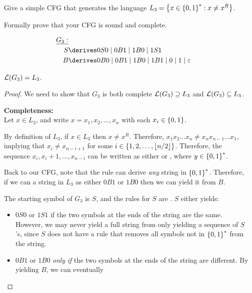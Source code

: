 \begin{problem}
  Give a simple CFG that generates the language
  $L_3 = \left\{x \in \left\{0, 1\right\}^* : x \ne x^R\right\}$.

  \step
  Formally prove that your CFG is sound and complete.
\end{problem}
\begin{Answer}
  \begin{align*}
    \underline{G_3:} \\
    S &\derives 0S0 \mid 0B1 \mid 1B0 \mid 1S1 \\
    B &\derives 0B0 \mid 0B1 \mid 1B0 \mid 1B1 \mid 0 \mid 1 \mid \eps
  \end{align*}

  \step
  \begin{claim}
    $\mathcal{L}(G_3) = L_3$.

    \begin{proof}
      We need to show that $G_3$ is both complete $\mathcal{L}(G_3) \supseteq L_3$
      and $\mathcal{L}(G_3) \subseteq L_3$.

      \step
      \textbf{Completeness:} \\
      Let $x \in L_3$, and write $x = x_1, x_2, \ldots, x_n$
      with each $x_i \in \left\{0, 1\right\}$.
      
      \step
      By definition of $L_3$, if $x \in L_3$ then $x \ne x^R$.
      Therefore, $x_1x_2 \ldots x_n \ne x_nx_{n-1} \ldots x_1$,
      implying that $x_i \ne x_{n-i+1}$ for some $i \in \left\{1, 2, \ldots, \lfloor{} n/2 \rfloor\right\}$.
      Therefore, the sequence $x_i, x_i+1, \ldots, x_{n-i}$
      can be written as either  or , where $y \in \left\{0, 1\right\}^*$.

      \step
      Back to our CFG, note that the rule
        can derive \emph{any} string in $\left\{0, 1\right\}^*$.
        Therefore, if we can a string in $L_3$ as either $0B1$ or $1B0$
        then we can yield it from $B$.

      \step
      The starting symbol of $G_3$ is $S$,
      and the rules for $S$ are .
      $S$ either yields:
      \begin{itemize}
        \item $0S0$ or $1S1$ if the two symbols at the ends of the string are the same.
          However, we may never yield a full string from only yielding a sequence of $S$'s,
          since $S$ does not have a rule that removes all symbols not in $\left\{0, 1\right\}^*$
          from the string.
        \item $0B1$ or $1B0$ \emph{only if} the two symbols at the ends of the string
          are different. By yielding $B$, we can eventually 
      \end{itemize}
    \end{proof}
  \end{claim}
\end{Answer}
